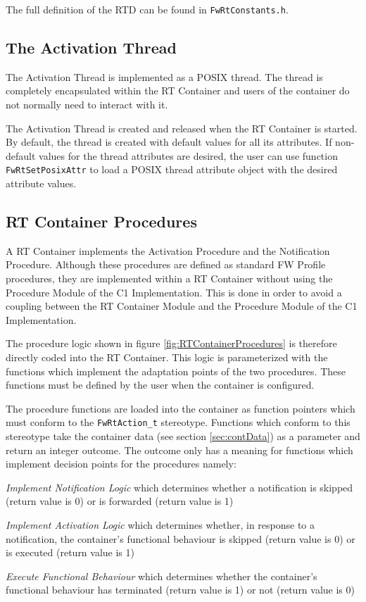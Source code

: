 \documentclass[a4paper,10pt]{article}
\newenvironment{fw_itemize}						%
{\begin{itemize}
  \setlength{\itemsep}{1mm}
  \setlength{\parskip}{0pt}
  \setlength{\parsep}{0pt}}
{\end{itemize}}
\begin{document}
The full definition of the RTD can be found in \texttt{FwRtConstants.h}.

\subsection{The Activation Thread}\label{sec:activThread}
The Activation Thread is implemented as a POSIX thread. The thread is completely encapsulated within the RT Container and users of the container do not normally need to interact with it.

The Activation Thread is created and released when the RT Container is started. By default, the thread is created with default values for all its attributes. If non-default values for the thread attributes are desired, the user can use function \texttt{FwRtSetPosixAttr} to load a POSIX thread attribute object with the desired attribute values. 

\subsection{RT Container Procedures}\label{sec:contProc}
A RT Container implements the Activation Procedure and the Notification Procedure. Although these procedures are defined as standard FW Profile procedures, they are implemented within a RT Container without using the Procedure Module of the C1 Implementation. This is done in order to avoid a coupling between the RT Container Module and the Procedure Module of the C1 Implementation. 

The procedure logic shown in figure \ref{fig:RTContainerProcedures} is therefore directly coded into the RT Container. This logic is parameterized with the functions which implement the adaptation points of the two procedures. These functions must be defined by the user when the container is configured.

The procedure functions are loaded into the container as function pointers which must conform to the \texttt{FwRtAction\_t} stereotype. Functions which conform to this stereotype take the container data (see section \ref{sec:contData}) as a parameter and return an integer outcome. The outcome only has a meaning for functions which implement decision points for the procedures namely:

\begin{fw_itemize}
\item \textit{Implement Notification Logic} which determines whether a notification is skipped (return value is 0) or is forwarded (return value is 1)
\item \textit{Implement Activation Logic} which determines whether, in response to a notification, the container's functional behaviour is skipped (return value is 0) or is executed (return value is 1)
\item \textit{Execute Functional Behaviour} which determines whether the container's functional behaviour has terminated (return value is 1) or not (return value is 0)
\end{fw_itemize}
\end{document}
